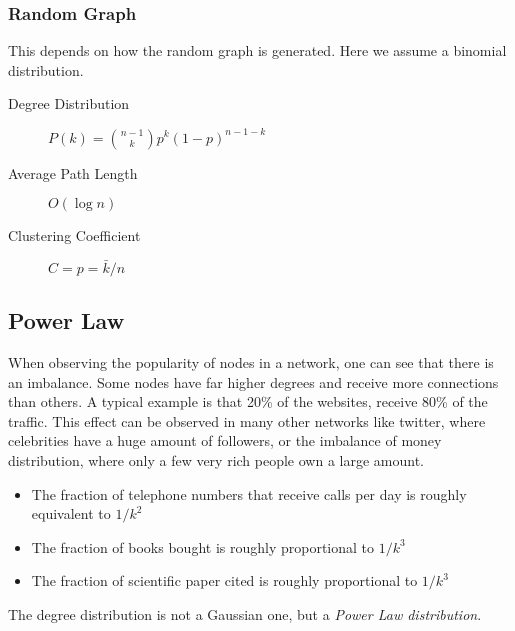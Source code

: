 	\subsubsection{Random Graph} %
	\label{ssub:random_graph}
	This depends on how the random graph is generated.
	Here we assume a binomial distribution.
		\begin{description}
			\item[Degree Distribution] $P(k) = \binom{n-1}{k}p^k(1-p)^{n-1-k}$
			\item[Average Path Length] $O(\log n)$
			\item[Clustering Coefficient] $C = p = \bar{k}/n$
		\end{description}

\subsection{Power Law} %
\label{sub:power_law}
When observing the popularity of nodes in a network,
one can see that there is an imbalance.
Some nodes have far higher degrees and receive more connections than others.
A typical example is that 20\% of the websites,
receive 80\% of the traffic.
This effect can be observed in many other networks like twitter,
where celebrities have a huge amount of followers,
or the imbalance of money distribution,
where only a few very rich people own a large amount.

\begin{itemize}
	\item The fraction of telephone numbers that receive calls per day is roughly equivalent to $1/k^2$
	\item The fraction of books bought is roughly proportional to $1/k^3$
	\item The fraction of scientific paper cited is roughly proportional to $1/k^3$
\end{itemize}

The degree distribution is not a Gaussian one,
but a \emph{Power Law distribution}.

